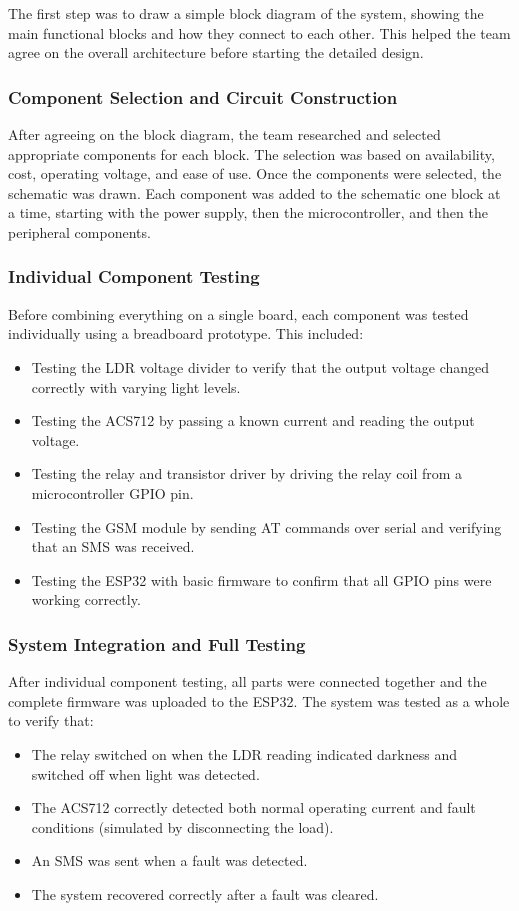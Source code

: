 \documentclass{article}
\begin{document}
The first step was to draw a simple block diagram of the system, showing the main functional blocks and how they connect to each other. This helped the team agree on the overall architecture before starting the detailed design.

\subsubsection{Component Selection and Circuit Construction}

After agreeing on the block diagram, the team researched and selected appropriate components for each block. The selection was based on availability, cost, operating voltage, and ease of use. Once the components were selected, the schematic was drawn. Each component was added to the schematic one block at a time, starting with the power supply, then the microcontroller, and then the peripheral components.

\subsubsection{Individual Component Testing}

Before combining everything on a single board, each component was tested individually using a breadboard prototype. This included:
\begin{itemize}
    \item Testing the LDR voltage divider to verify that the output voltage changed correctly with varying light levels.
    \item Testing the ACS712 by passing a known current and reading the output voltage.
    \item Testing the relay and transistor driver by driving the relay coil from a microcontroller GPIO pin.
    \item Testing the GSM module by sending AT commands over serial and verifying that an SMS was received.
    \item Testing the ESP32 with basic firmware to confirm that all GPIO pins were working correctly.
\end{itemize}

\subsubsection{System Integration and Full Testing}

After individual component testing, all parts were connected together and the complete firmware was uploaded to the ESP32. The system was tested as a whole to verify that:
\begin{itemize}
    \item The relay switched on when the LDR reading indicated darkness and switched off when light was detected.
    \item The ACS712 correctly detected both normal operating current and fault conditions (simulated by disconnecting the load).
    \item An SMS was sent when a fault was detected.
    \item The system recovered correctly after a fault was cleared.
\end{itemize}
\end{document}
